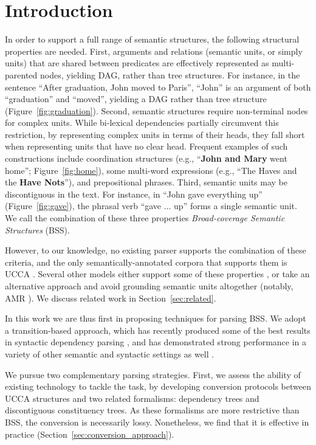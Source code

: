 \documentclass[11pt]{article}
\newcommand{\secref}[1]{Section~\ref{#1}}
\newcommand{\figref}[1]{Figure~\ref{#1}}
\begin{document}
\section{Introduction}

In order to support a full range of semantic structures, the following
structural properties are needed. First, arguments and relations (semantic units, or simply
units) that are shared between predicates are effectively represented as multi-parented nodes,
yielding DAG, rather than tree structures. For instance, in the sentence
``After graduation, John moved to Paris'', ``John'' is an argument of both ``graduation''
and ``moved'', yielding a DAG rather than tree structure (\figref{fig:graduation}).
Second, semantic structures require non-terminal nodes for complex units.
While bi-lexical dependencies partially circumvent this restriction, by
representing complex units in terms of their heads, they fall short
when representing units that have no clear head.
Frequent examples of such constructions include
coordination structures (e.g., ``{\bf John and Mary} went home''; \figref{fig:home}),
some multi-word expressions (e.g., ``The Haves and the {\bf Have Nots}''),
and prepositional phrases.
Third, semantic units may be discontiguous in the text. For instance, in ``John gave everything up'' (\figref{fig:gave}),
the phrasal verb ``gave ... up'' forms a single semantic unit.
We call the combination of these three properties
{\it Broad-coverage Semantic Structures} (BSS).

However, to our knowledge, no existing parser supports the combination of these criteria,
and the only semantically-annotated corpora that supports them is UCCA \cite{abend2013universal}.
Several other models either support some of these properties \cite{oepen2015semeval},
or take an alternative approach and avoid grounding semantic units
altogether (notably, AMR \cite{banarescu2013abstract}). We discuss related work in \secref{sec:related}.

In this work we are thus first in proposing techniques for parsing BSS.
We adopt a transition-based approach, which has recently produced some of the best
results in syntactic dependency parsing
\cite{dyer2015transition,ballesteros2015improved}, and has demonstrated
strong performance in a variety of other semantic and syntactic settings as well
\cite{maier2015discontinuous,ambati2015incremental,wang2015transition}.

We pursue two complementary parsing strategies.
First, we assess the ability of existing technology to tackle the task,
by developing conversion protocols between UCCA structures and two related formalisms:
dependency trees and discontiguous constituency trees.
As these formalisms are more restrictive than BSS, the conversion
is necessarily lossy. Nonetheless, we find that it is effective
in practice (\secref{sec:conversion_approach}).
\end{document}
